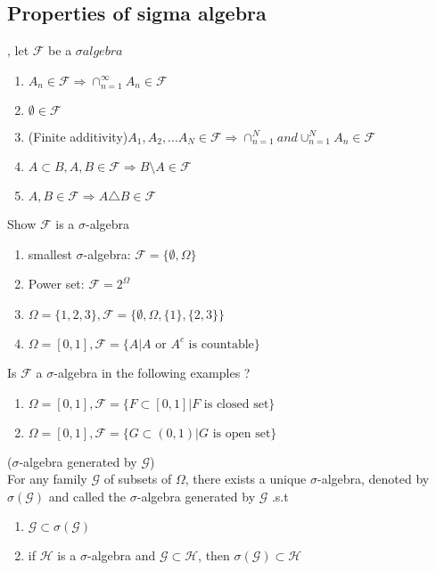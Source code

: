 \subsection{Properties of sigma algebra}, let $\mathcal{F}$ be a $\sigma algebra$
\begin{enumerate}
    \item $A_n\in \mathcal{F} \Rightarrow \cap_{n=1}^{\infty}A_n \in \mathcal{F}$
    \item $\emptyset \in \mathcal{F}$
    \item (Finite additivity)$A_1,A_2,...A_N \in \mathcal{F} \Rightarrow \cap_{n=1}^{N} and \cup_{n=1}^{N}A_n\in \mathcal{F}$
    \item $A\subset B, A,B\in \mathcal{F} \Rightarrow B\setminus A\in \mathcal{F}$
    \item $A,B\in \mathcal{F} \Rightarrow A\triangle B\in \mathcal{F} $
\end{enumerate}
\newpage
\begin{ex} Show $\mathcal{F}$ is a $\sigma$-algebra
\begin{enumerate}
    \item smallest $\sigma$-algebra: $\mathcal{F} = \{\emptyset, \Omega\}$
    \item Power set: $\mathcal{F} = 2^\Omega$
    \item $\Omega = \{1,2,3\}, \mathcal{F} = \{\emptyset, \Omega, \{1\}, \{2,3\}\}$
    \item $\Omega = [0,1], \mathcal{F} = \{A | A \text{ or } A^c \text{ is countable}\}$
\end{enumerate}
\end{ex}
\newpage
\begin{ex} Is $\mathcal{F}$ a $\sigma$-algebra in the following examples ?
\begin{enumerate}
    \item $\Omega = [0,1], \mathcal{F} = \{F\subset [0,1] | F \text{ is closed set}\}$
    \item $\Omega = [0,1], \mathcal{F} = \{G\subset (0,1) | G \text{ is open set}\}$
\end{enumerate}
\end{ex}
\newpage
\begin{thm} ($\sigma$-algebra generated by $\mathcal{G}$) \\
For any family $\mathcal{G}$ of subsets of $\Omega$, there exists a unique $\sigma$-algebra, denoted by $\sigma(\mathcal{G})$ and called the $\sigma$-algebra generated by $\mathcal{G}$ .s.t
\begin{enumerate}
    \item $\mathcal{G} \subset \sigma(\mathcal{G})$
    \item if $\mathcal{H}$ is a $\sigma$-algebra and $\mathcal{G}\subset\mathcal{H}$, then $\sigma(\mathcal{G}) \subset \mathcal{H}$
\end{enumerate}
\end{thm}
